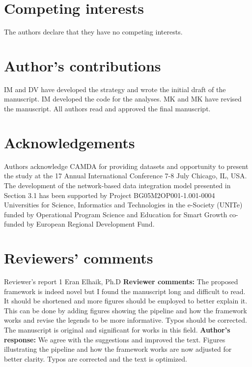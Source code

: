 \documentclass{bmcart}
\begin{document}
\begin{backmatter}
\section*{Competing interests}
  The authors declare that they have no competing interests.

\section*{Author's contributions}
IM and DV have developed the strategy and wrote
the initial draft of the manuscript. IM developed the code for the
analyses. MK and MK have revised the manuscript. All authors read and
approved the final manuscript. 

\section*{Acknowledgements}
Authors acknowledge CAMDA for providing datasets and opportunity to present the
study at the 17 Annual International Conference 7-8 July Chicago, IL, USA.  The
development of the network-based data integration model presented in Section	
3.1 has been supported by Project BG05M2OP001-1.001-0004 Universities for
Science, Informatics and Technologies in the e-Society (UNITe) funded by
Operational Program Science and Education for Smart Growth co-funded by
European Regional Development Fund.


\section*{Reviewers' comments}
\newline Reviewer's report 1
\newline Eran Elhaik, Ph.D
\newline \textbf{Reviewer comments:}
The proposed framework is indeed novel but I found the manuscript long and difficult to read. It should be shortened and more figures should be employed to better explain it. This can be done by adding figures showing the pipeline and how the framework works and revise the legends to be more informative. Typos should be corrected. The manuscript is original and significant for works in this field.
\newline \textbf{Author's response:}
We agree with the suggestions and improved the text. Figures illustrating the pipeline and how the framework works are now adjusted for better clarity. Typos are corrected and the text is optimized.


\end{backmatter}
\end{document}
